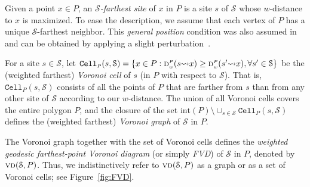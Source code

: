 \documentclass[a4paper,UKenglish]{socg-lipics-v2018}
\newcommand{\s}{\mathcal S}
\newcommand{\dd}[3][P]{\ensuremath{\textsc{d}_{\scriptscriptstyle w}^{\scriptscriptstyle #1}(#2 {\leadsto} #3)}}
\newcommand{\cell}[2][P]{\ensuremath{\mathtt{Cell}_{\scriptscriptstyle #1}(#2)}}
\newcommand{\interior}[1]{\mathrm{int}(#1)}
\newcommand{\vd}[2][P]{\textsc{vd}(#2, #1)}
\begin{document}
Given a point $x\in P$, an \emph{$\s$-farthest site} of $x$ in $P$ is a site  $s$ of  $\s$ whose $w$-distance to $x$ is maximized.
To ease the description, we assume that each vertex of $P$ has a unique $\s$-farthest neighbor. 
This \emph{general position} condition was also assumed in~\cite{ahn2015linear,aronov1993furthest,oh2016farthest} and can be obtained by applying a slight perturbation~\cite{edelsbrunner1990simulation}.

For a site $s\in \s$, let $\cell{s,\s} = \{x\in P: \dd{s}{x} \geq \dd{s'}{x}, \forall s'\in \s\}$ be the (weighted farthest) \emph{Voronoi cell} of $s$ (in $P$ with respect to $\s$). 
That is, $\cell{s,\s}$ consists of all the points of $P$ that are farther from $s$ than from any other site of $\s$ according to our $w$-distance.
The union of all Voronoi cells covers the entire polygon $P$, and the closure of the set $\interior{P} \setminus \cup_{s \in \s} \cell{s,\s}$ defines the (weighted farthest) \emph{Voronoi graph} of $\s$ in $P$. 

The Voronoi graph together with the set of Voronoi cells defines the \emph{weighted geodesic farthest-point
Voronoi diagram} (or simply \emph{FVD}) of $\s$ in $P$, denoted by $\vd{\s}$.
Thus, we indistinctively refer to $\vd{\s}$ as a graph or as a set of Voronoi cells; see Figure~\ref{fig:FVD}.
\end{document}
